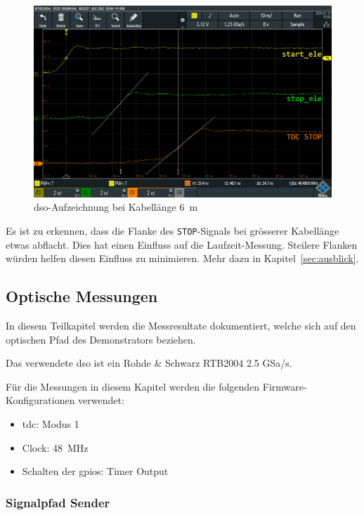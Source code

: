 \begin{figure}[H]
    \centering
    \includegraphics[width=\textwidth]{graphics/different_cable_lengths_with_dso_6m.png}
    \caption{\acrshort{dso}-Aufzeichnung bei Kabellänge 6~m}\label{fig:different_cable_lengths_with_dso_6m}
\end{figure}

Es ist zu erkennen, dass die Flanke des \lstinline|STOP|-Signals bei grösserer Kabellänge etwas abflacht. Dies hat einen
Einfluss auf die Laufzeit-Messung. Steilere Flanken würden helfen diesen Einfluss zu minimieren. Mehr dazu in
Kapitel~\ref{sec:ausblick}.

\pagebreak

\subsection{Optische Messungen}

In diesem Teilkapitel werden die Messresultate dokumentiert, welche sich auf den optischen Pfad des Demonstrators
beziehen.

Das verwendete \acrshort{dso} ist ein Rohde \& Schwarz RTB2004 2.5 GSa/s.

Für die Messungen in diesem Kapitel werden die folgenden Firmware-Konfigurationen verwendet:

\begin{itemize}
    \item \acrshort{tdc}: Modus 1
    \item Clock: 48~MHz
    \item Schalten der \acrshort{gpio}s: Timer Output
\end{itemize}

\subsubsection{Signalpfad Sender}\label{sec:messungen_signalpfad_sender}

